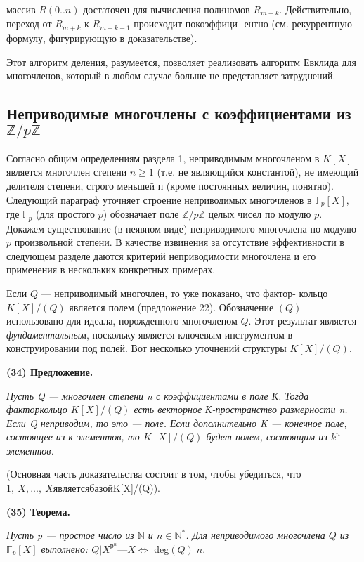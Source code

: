 \documentclass{mai_book}
\begin{document}
\noindent массив $R(0 .. n)$ достаточен для вычисления полиномов $R_{m+k}$. 
Действительно, переход от $R_{m+k}$ к $R_{m+k-1}$ происходит покоэффици- 
ентно (см. рекуррентную формулу, фигурирующую в доказательстве).
 
Этот алгоритм деления, разумеется, позволяет реализовать  
алгоритм Евклида для многочленов, который в любом случае больше не 
представляет затруднений. 
\subsection{Неприводимые многочлены с коэффициентами из $\mathbb{Z}\slash p\mathbb{Z}$} 
Согласно общим определениям раздела 1, неприводимым многочленом 
в $K[X]$ является многочлен степени $n\geq 1$ (т.е. не являющийся  
константой), не имеющий делителя степени, строго меньшей п (кроме  
постоянных величин, понятно). Следующий параграф уточняет строение 
неприводимых многочленов в $\mathbb{F}_p[X]$, где $\mathbb{F}_p$ (для простого $p$) обозначает 
поле $\mathbb{Z}\slash p\mathbb{Z}$ целых чисел по модулю $p$. Докажем существование (в неявном 
виде) неприводимого многочлена по модулю $p$ произвольной степени. 
В качестве извинения за отсутствие эффективности в следующем  
разделе даются критерий неприводимости многочлена и его применения в 
нескольких конкретных примерах. 

Если $Q$ — неприводимый многочлен, то уже показано, что фактор- 
кольцо $K[X]\slash(Q)$ является полем (предложение 22). Обозначение $(Q)$  
использовано для идеала, порожденного многочленом $Q$. Этот результат 
является \textit{фундаментальным}, поскольку является ключевым  
инструментом в конструировании под полей. Вот несколько уточнений структуры 
$K[X]\slash(Q)$. 

\noindent\textbf{(34) Предложение.}

\textit{Пусть Q — многочлен степени n с коэффициентами в поле К. Тогда 
факторкольцо $K[X]\slash(Q)$ есть векторное К-пространство размерности 
n. Если Q неприводим, то это — поле. Если дополнительно K —  
конечное поле, состоящее из к элементов, то $K[X]\slash(Q)$ будет полем,  
состоящим из $k^n$ элементов.}

(Основная часть доказательства состоит в том, чтобы убедиться, 
что $\overline{1},\: \overline{X},...,\: \overline{X} является базой $K[X]\slash(Q)).

\noindent\textbf{(35) Теорема.} 

\textit{Пусть p — простое число из $\mathbb{N}$ и $ n \in \mathbb{N}^*$. Для неприводимого 
многочлена $Q$ из $\mathbb{F}_p[X]$ выполнено: $Q | X^{р^n} — X \Leftrightarrow$} deg$(Q) | n$. 
\pagebreak
\end{document}
